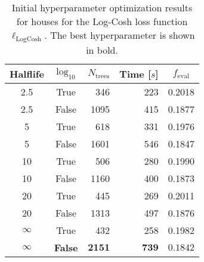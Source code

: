 \begin{table}[h!]
  \begin{tabular}{@{}ccrrc@{}}
    Halflife & $\log_{10}$ & $N_\mathrm{trees}$ & Time [$s$] & $f_\mathrm{eval}$ \\
    \midrule
    \num{2.5} & True & \num{346} & \num{223} & \num{0.2018} \\
    \num{2.5} & False & \num{1095} & \num{415} & \num{0.1877} \\
    \num{5} & True & \num{618} & \num{331} & \num{0.1976} \\
    \num{5} & False & \num{1601} & \num{546} & \num{0.1847} \\
    \num{10} & True & \num{506} & \num{280} & \num{0.1990} \\
    \num{10} & False & \num{1160} & \num{400} & \num{0.1873} \\
    \num{20} & True & \num{445} & \num{269} & \num{0.2011} \\
    \num{20} & False & \num{1313} & \num{497} & \num{0.1876} \\
    $\infty$ & True & \num{432} & \num{258} & \num{0.1982} \\
    $\bm{\infty}$ & \textbf{False} & $\mathbf{2151}$ & $\mathbf{739}$ & $\mathbf{0.1842}$ \\
  \end{tabular}
  \caption[Initial Hyperparameter Optimization Results for Houses -- Log-Cosh Loss Function]{\label{tab:h:HPO_initial_Logcosh-villa-appendix}Initial hyperparameter optimization results for houses for the Log-Cosh loss function $\ell_\mathrm{LogCosh}$. The best hyperparameter is shown in bold.}
\end{table}


